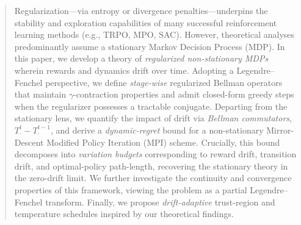 \documentclass{article}
\theoremstyle{plain}
\theoremstyle{definition}
\theoremstyle{remark}
\newcommand{\1}{\mathbbm{1}}
\begin{document}

\printAffiliationsAndNotice{\icmlEqualContribution}

\begin{abstract}
Regularization---via entropy or divergence penalties---underpins the stability and exploration capabilities of many successful reinforcement learning methods (e.g., TRPO, MPO, SAC). However, theoretical analyses predominantly assume a stationary Markov Decision Process (MDP). In this paper, we develop a theory of \emph{regularized non-stationary MDPs} wherein rewards and dynamics drift over time. Adopting a Legendre--Fenchel perspective, we define \emph{stage-wise} regularized Bellman operators that maintain $\gamma$-contraction properties and admit closed-form greedy steps when the regularizer possesses a tractable conjugate. Departing from the stationary lens, we quantify the impact of drift via \emph{Bellman commutators}, $T_\cdot^t - T_\cdot^{t-1}$, and derive a \emph{dynamic-regret} bound for a non-stationary Mirror-Descent Modified Policy Iteration (MPI) scheme. Crucially, this bound decomposes into \emph{variation budgets} corresponding to reward drift, transition drift, and optimal-policy path-length, recovering the stationary theory in the zero-drift limit. We further investigate the continuity and convergence properties of this framework, viewing the problem as a partial Legendre--Fenchel transform. Finally, we propose \emph{drift-adaptive} trust-region and temperature schedules inspired by our theoretical findings.
\end{abstract}
\end{document}
